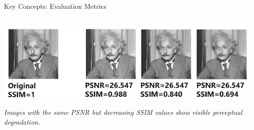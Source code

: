 \documentclass[aspectratio=169,xcolor=dvipsnames]{beamer}
\begin{document}
\begin{frame}{Key Concepts: Evaluation Metrics}
\begin{columns}[c]
\begin{column}{0.50\textwidth}
\begin{center}
    \includegraphics[width=0.7\linewidth]{PSNRvsSSIM.png}
\end{center}
\vspace{-0.2cm}
\tiny \textit{Images with the same PSNR but decreasing SSIM values show visible perceptual degradation.}

\end{column}

\end{columns}

\end{frame}
\end{document}
